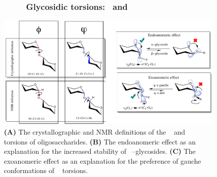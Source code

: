 \documentclass[journal=jctcce,manuscript=article]{achemso}
\begin{document}
{\subsubsection*{~~~~~~~~~Glycosidic torsions: \textphi~and \textphi}

\begin{figure}[bl!]
    \centering
    \includegraphics[width=14cm]{phi_psi_endo_exo.pdf}
    \caption{\textbf{(A)} The crystallographic and NMR definitions of the \textphi~ and \textpsi~ torsions of oligosaccharides. \textbf{(B)} The endoanomeric effect as an explanation for the increased stability of \textalpha~--glycosides. \textbf{(C)} The exoanomeric effect as an explanation for the preference of gauche conformations of \textpsi~ torsions. }
    \label{fig:phipsiendoexo}
\end{figure}

}
\end{document}
